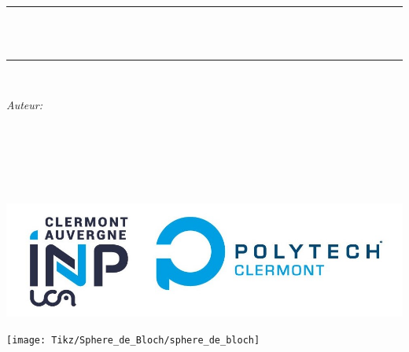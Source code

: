 
\begin{titlepage}
	\newcommand{\HRule}{\rule{\linewidth}{0.5mm}}
	\centering 
	\quad\\[1.5cm]
	
	
	\makeatletter
	\HRule \\[0.4cm]
	{ \huge \bfseries \@title}\\[0.4cm] 
	\HRule \\[1.5cm]
	\begin{minipage}{0.4\textwidth}
		\begin{flushleft} \large
			\emph{Auteur:}\\
			\@author 
		\end{flushleft}
	\end{minipage}
	~
	\begin{minipage}{0.4\textwidth}
		\begin{flushright} \large
			\emph{} \\
			\textup{}
		\end{flushright}
	\end{minipage}\\[1cm]
	\makeatother	
	
	\includegraphics[width=0.4\linewidth]{first_page/logo_inp_polytech_2023_rvb.jpg}
	
	
	
	
	\vspace{2cm}
	


	\texttt{[image: Tikz/Sphere\_de\_Bloch/sphere\_de\_bloch]}




	
	
	
	
	
	
	
	
	
	
	\vfill 
	
\end{titlepage}

